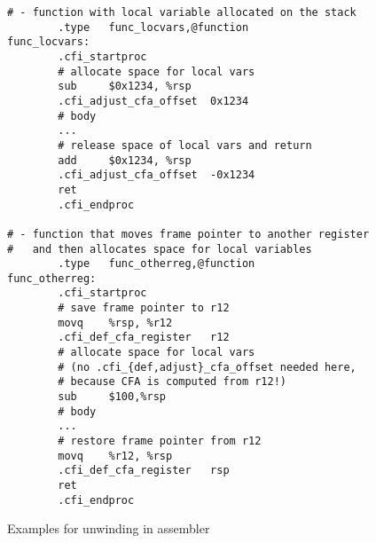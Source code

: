 \begin{figure}[H]
\Hrule
\caption{Examples for unwinding in assembler}
\label{fig_asm_unwinding}
\begin{center}
\begin{small}
\begin{verbatim}
# - function with local variable allocated on the stack
        .type   func_locvars,@function
func_locvars:
        .cfi_startproc
        # allocate space for local vars
        sub     $0x1234, %rsp
        .cfi_adjust_cfa_offset  0x1234
        # body
        ...
        # release space of local vars and return
        add     $0x1234, %rsp
        .cfi_adjust_cfa_offset  -0x1234
        ret
        .cfi_endproc

# - function that moves frame pointer to another register
#   and then allocates space for local variables
        .type   func_otherreg,@function
func_otherreg:
        .cfi_startproc
        # save frame pointer to r12
        movq    %rsp, %r12
        .cfi_def_cfa_register   r12
        # allocate space for local vars 
        # (no .cfi_{def,adjust}_cfa_offset needed here, 
        # because CFA is computed from r12!)
        sub     $100,%rsp
        # body
        ...
        # restore frame pointer from r12
        movq    %r12, %rsp
        .cfi_def_cfa_register   rsp
        ret
        .cfi_endproc
\end{verbatim}
\end{small}
\end{center}
\Hrule
\end{figure}

